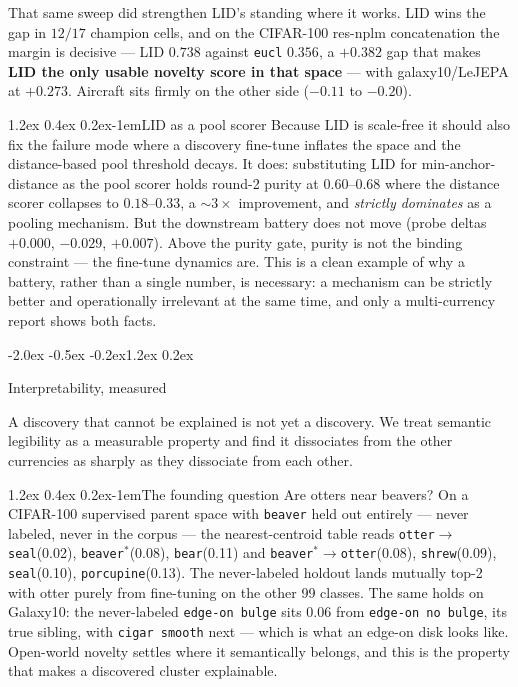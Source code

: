 \documentclass{article}
\makeatletter
\renewcommand\section{\@startsection{section}{1}{\z@}%
  {-2.0ex \@plus -0.5ex \@minus -0.2ex}{1.2ex \@plus 0.2ex}%
  {\large\bf\raggedright}}
\renewcommand\paragraph{\@startsection{paragraph}{4}{\z@}%
  {1.2ex \@plus 0.4ex \@minus 0.2ex}{-1em}{\normalsize\bf}}
\newcommand{\lid}{\mathrm{LID}}
\makeatother
\begin{document}
That same sweep did strengthen LID's standing where it works. LID wins the gap
in $12/17$ champion cells, and on the CIFAR-100 res-nplm concatenation the
margin is decisive --- LID $0.738$ against \texttt{eucl} $0.356$, a $+0.382$ gap
that makes \textbf{LID the only usable novelty score in that space} --- with
galaxy10/LeJEPA at $+0.273$. Aircraft sits firmly on the other side
($-0.11$ to $-0.20$).

\paragraph{$\lid$ as a pool scorer}
Because $\lid$ is scale-free it should also fix the failure mode where a
discovery fine-tune inflates the space and the distance-based pool threshold
decays. It does: substituting $\lid$ for min-anchor-distance as the pool
scorer holds round-2 purity at $0.60$--$0.68$ where the distance scorer
collapses to $0.18$--$0.33$, a $\sim3\times$ improvement, and \emph{strictly
dominates} as a pooling mechanism. But the downstream battery does not move
(probe deltas $+0.000$, $-0.029$, $+0.007$). Above the purity gate, purity is
not the binding constraint --- the fine-tune dynamics are. This is a clean
example of why a battery, rather than a single number, is necessary: a
mechanism can be strictly better and operationally irrelevant at the same time,
and only a multi-currency report shows both facts.

\section{Interpretability, measured}
\label{sec:interp}

A discovery that cannot be explained is not yet a discovery. We treat semantic
legibility as a measurable property and find it dissociates from the other
currencies as sharply as they dissociate from each other.

\paragraph{The founding question}
Are otters near beavers? On a CIFAR-100 supervised parent space with
\texttt{beaver} held out entirely --- never labeled, never in the corpus --- the
nearest-centroid table reads
\texttt{otter}$\to$\texttt{seal}(0.02), \texttt{beaver}$^*$(0.08),
\texttt{bear}(0.11) and
\texttt{beaver}$^*\to$\texttt{otter}(0.08), \texttt{shrew}(0.09),
\texttt{seal}(0.10), \texttt{porcupine}(0.13).
The never-labeled holdout lands mutually top-2 with otter purely from
fine-tuning on the other 99 classes. The same holds on Galaxy10: the
never-labeled \texttt{edge-on bulge} sits $0.06$ from \texttt{edge-on no
bulge}, its true sibling, with \texttt{cigar smooth} next --- which is what an
edge-on disk looks like. Open-world novelty settles where it semantically
belongs, and this is the property that makes a discovered cluster explainable.
\end{document}
